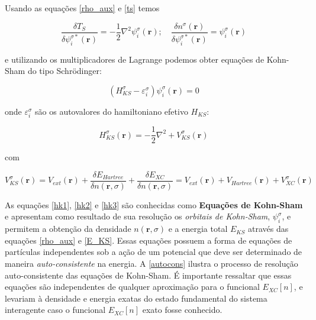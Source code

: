 	Usando as equações \ref{rho_aux} e \ref{ts} temos
	
	\begin{equation}
		\frac{\delta T_S}{\delta \psi_i^{\sigma *}(\textbf{r})} = -\frac{1}{2} \nabla^2 \psi_i^{\sigma}(\textbf{r}); \quad \frac{\delta n^\sigma(\textbf{r})}{\delta \psi_i^{\sigma *}(\textbf{r})} = \psi_i^{\sigma}(\textbf{r})
	\end{equation}
	
	e utilizando os multiplicadores de Lagrange podemos obter equações de Kohn-Sham do tipo Schrödinger:
	
	\begin{equation}
		(H^\sigma_{KS} - \varepsilon^\sigma_i)\psi_i^{\sigma}(\textbf{r}) = 0
		\label{hk1}
	\end{equation}
	
	onde $\varepsilon^\sigma_i$ são os autovalores do hamiltoniano efetivo $H_{KS}$:
	
	\begin{equation}
		H^\sigma_{KS}(\textbf{r}) = -\frac{1}{2}\nabla^2 + V^\sigma_{KS}(\textbf{r})
		\label{hk2}
	\end{equation}
	
	com 
	
	\begin{equation}
		V^\sigma_{KS}(\textbf{r}) = V_{ext}(\textbf{r}) + \frac{\delta E_{Hartree}}{\delta n(\textbf{r}, \sigma)} + \frac{\delta E_{XC}}{\delta n(\textbf{r}, \sigma)} =  V_{ext}(\textbf{r}) +  V_{Hartree}(\textbf{r}) +  V_{XC}^\sigma(\textbf{r})
		\label{hk3}
	\end{equation}
	
	As equações \ref{hk1}, \ref{hk2} e \ref{hk3} são conhecidas como \textbf{Equações de Kohn-Sham} e apresentam como resultado de sua resolução os \textit{orbitais de Kohn-Sham}, $\psi_i^\sigma$, e permitem a obtenção da densidade $n(\textbf{r}, \sigma)$ e a energia total $E_{KS}$ através das equações \ref{rho_aux} e \ref{E_KS}. Essas equações possuem a forma de equações de partículas independentes sob a ação de um potencial que deve ser determinado de maneira \textit{auto-consistente} na energia. A \autoref{autocons} ilustra o processo de resolução auto-consistente das equações de Kohn-Sham. É importante ressaltar que essas equações são independentes de qualquer aproximação para o funcional $E_{XC}[n]$, e levariam à densidade e energia exatas do estado fundamental do sistema interagente caso o funcional $E_{XC}[n]$ exato fosse conhecido.
	
